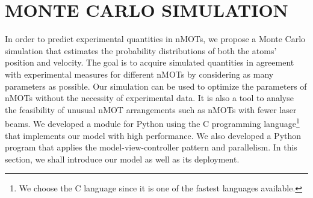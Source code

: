 %
\chapter{MONTE CARLO SIMULATION}
\label{ch:Monte-Carlo-simulation}
%

In order to predict experimental quantities in nMOTs, we propose a Monte Carlo simulation that estimates the probability distributions of both the atoms' position and velocity. The goal is to acquire simulated quantities in agreement with experimental measures for different nMOTs by considering as many parameters as possible. Our simulation can be used to optimize the parameters of nMOTs without the necessity of experimental data. It is also a tool to analyse the feasibility of unusual nMOT arrangements such as nMOTs with fewer laser beams. We developed a module for Python using the C programming language\footnote{We choose the C language since it is one of the fastest languages available.} that implements our model with high performance. We also developed a Python program that applies the model-view-controller pattern and parallelism. In this section, we shall introduce our model as well as its deployment.


%


%

